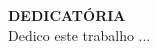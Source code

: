 %
%

\thispagestyle{empty}
\begin{dedicatoria}
    \begin{flushright}
        \textbf{DEDICATÓRIA}\\ %
        \vspace{\baselineskip}
        Dedico este trabalho ...
    \end{flushright}

\end{dedicatoria}
